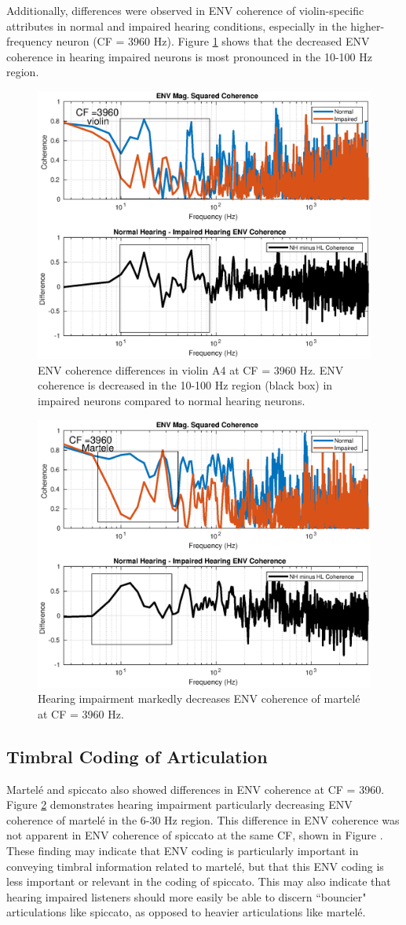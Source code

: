 \documentclass[conference]{IEEEtran}
\begin{document}
Additionally, differences were observed in ENV coherence of violin-specific attributes in normal and impaired hearing conditions, especially in the higher-frequency neuron (CF = 3960 Hz). Figure \ref{viol_env} shows that the decreased ENV coherence in hearing impaired neurons is most pronounced in the 10-100 Hz region. 

\begin{figure}[h]
\includegraphics[width = .5\textwidth]{violin_ENV_COH_3960}
\caption{ENV coherence differences in violin A4 at CF = 3960 Hz. ENV coherence is decreased in the 10-100 Hz region (black box) in impaired neurons compared to normal hearing neurons.}
\label{viol_env}
\end{figure} 

\begin{figure}[h]
\includegraphics[width = .5\textwidth]{martele_ENV_diff}
\caption{Hearing impairment markedly decreases ENV coherence of martel\'{e} at CF = 3960 Hz. }
\label{mart_env}
\end{figure} 

\subsection{Timbral Coding of Articulation}

Martel\'{e} and spiccato also showed differences in ENV coherence at CF = 3960. Figure \ref{mart_env} demonstrates hearing impairment particularly decreasing ENV coherence of martel\'{e} in the 6-30 Hz region. This difference in ENV coherence was not apparent in ENV coherence of spiccato at the same CF, shown in Figure . These finding may indicate that ENV coding is particularly important in conveying timbral information related to martel\'{e}, but that this ENV coding is less important or relevant in the coding of spiccato. This may also indicate that hearing impaired listeners should more easily be able to discern ``bouncier" articulations like spiccato, as opposed to heavier articulations like martel\'{e}. 
\end{document}
